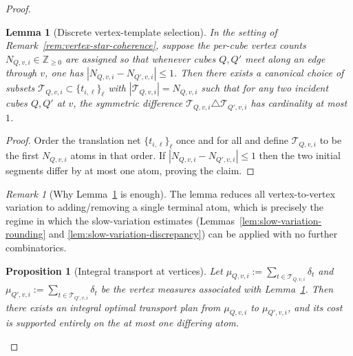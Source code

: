 \documentclass[11pt]{article}
\numberwithin{equation}{section}  %
\theoremstyle{plain}
\newtheorem{lemma}[theorem]{Lemma}
\newtheorem{proposition}[theorem]{Proposition}
\theoremstyle{definition}
\theoremstyle{remark}
\newtheorem{remark}[theorem]{Remark}
\newcommand{\Z}{\mathbb{Z}}
\begin{document}
\begin{proof}
%
\begin{lemma}[Discrete vertex-template selection]\label{lem:vertex-template-discrete}
In the setting of Remark~\ref{rem:vertex-star-coherence}, suppose the per-cube vertex counts $N_{Q,v,i}\in\Z_{\ge 0}$ are assigned so that
whenever cubes $Q,Q'$ meet along an edge through $v$, one has $|N_{Q,v,i}-N_{Q',v,i}|\le 1$.
Then there exists a canonical choice of subsets $\mathcal T_{Q,v,i}\subset \{t_{i,\ell}\}_\ell$ with $|\mathcal T_{Q,v,i}|=N_{Q,v,i}$ such that
for any two incident cubes $Q,Q'$ at $v$, the symmetric difference $\mathcal T_{Q,v,i}\triangle \mathcal T_{Q',v,i}$ has cardinality at most $1$.
\end{lemma}

\begin{proof}
Order the translation net $\{t_{i,\ell}\}_\ell$ once and for all and define $\mathcal T_{Q,v,i}$ to be the first $N_{Q,v,i}$ atoms in that order.
If $|N_{Q,v,i}-N_{Q',v,i}|\le 1$ then the two initial segments differ by at most one atom, proving the claim.
\end{proof}

%
\begin{remark}[Why Lemma~\ref{lem:vertex-template-discrete} is enough]\label{rem:vertex-template-discrete}
The lemma reduces all vertex-to-vertex variation to adding/removing a single terminal atom, which is precisely the regime in which the
slow-variation estimates (Lemmas~\ref{lem:slow-variation-rounding} and \ref{lem:slow-variation-discrepancy}) can be applied with no further combinatorics.
\end{remark}


%
\begin{proposition}[Integral transport at vertices]\label{prop:vertex-template-transport}
Let $\mu_{Q,v,i}:=\sum_{t\in\mathcal T_{Q,v,i}} \delta_t$ and $\mu_{Q',v,i}:=\sum_{t\in\mathcal T_{Q',v,i}} \delta_t$ be the vertex measures
associated with Lemma~\ref{lem:vertex-template-discrete}. Then there exists an integral optimal transport plan from $\mu_{Q,v,i}$ to $\mu_{Q',v,i}$,
and its cost is supported entirely on the at most one differing atom.
\end{proposition}


\end{proof}
\end{document}
